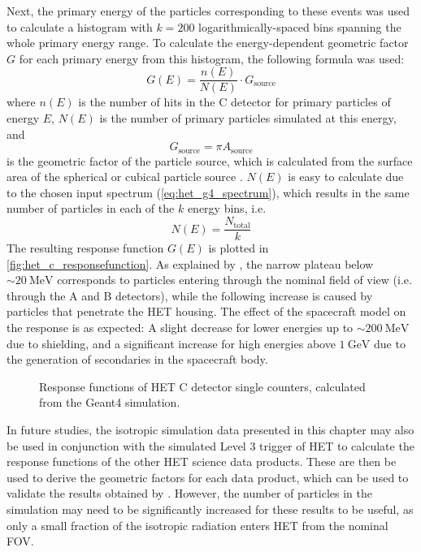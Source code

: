 Next, the primary energy of the particles corresponding to these events was used to calculate a histogram with $k=200$ logarithmically-spaced bins spanning the whole primary energy range. To calculate the energy-dependent geometric factor $G$ for each primary energy from this histogram, the following formula \citep[based on][equation 18]{Sullivan-1971} was used:
\begin{equation}
G(E) = \frac{n(E)}{N(E)} \cdot G_\text{source}
\end{equation}
where $n(E)$ is the number of hits in the C detector for primary particles of energy $E$, $N(E)$ is the number of primary particles simulated at this energy, and
\begin{equation}
G_\text{source} = \pi A_\text{source}
\end{equation}
is the geometric factor of the particle source, which is calculated from the surface area of the spherical or cubical particle source \citep[equation 6]{Sullivan-1971}. $N(E)$ is easy to calculate due to the chosen input spectrum (\autoref{eq:het_g4_spectrum}), which results in the same number of particles in each of the $k$ energy bins, i.e.
\begin{equation}
N(E) = \frac{N_\text{total}}{k}
\end{equation}
The resulting response function $G(E)$ is plotted in \autoref{fig:het_c_responsefunction}. As explained by \citet[Section 2.1]{Forstner-2021-SolO}, the narrow plateau below $\sim\SI{20}{\mega\electronvolt}$ corresponds to particles entering through the nominal field of view (i.e. through the A and B detectors), while the following increase is caused by particles that penetrate the \ac{HET} housing. The effect of the spacecraft model on the response is as expected: A slight decrease for lower energies up to $\sim\SI{200}{\mega\electronvolt}$ due to shielding, and a significant increase for high energies above $\SI{1}{\giga\electronvolt}$ due to the generation of secondaries in the spacecraft body.

\begin{figure}
	\centering
	
	\caption[Response functions of \ac{HET} C detector single counters]{Response functions of \ac{HET} C detector single counters, calculated from the \ac{Geant4} simulation.}
	\label{fig:het_c_responsefunction}
\end{figure}

In future studies, the isotropic simulation data presented in this chapter may also be used in conjunction with the simulated Level 3 trigger of HET to calculate the response functions of the other \ac{HET} science data products. These are then be used to derive the geometric factors for each data product, which can be used to validate the results obtained by \citet{Elftmann-2020-PhD}. However, the number of particles in the simulation may need to be significantly increased for these results to be useful, as only a small fraction of the isotropic radiation enters HET from the nominal \ac{FOV}.